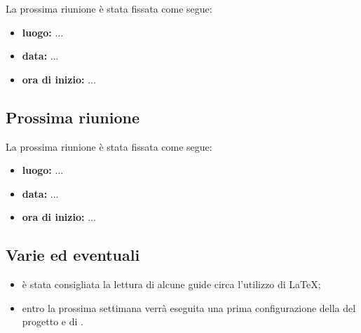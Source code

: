 		
		
		
La prossima riunione è stata fissata come segue:
\begin{itemize}
	\item \textbf{luogo:} ...
	\item \textbf{data:} ...
	\item \textbf{ora di inizio:} ...
\end{itemize}


\subsection{Prossima riunione}
La prossima riunione è stata fissata come segue:
\begin{itemize}
	\item \textbf{luogo:} ...
	\item \textbf{data:} ...
	\item \textbf{ora di inizio:} ...
\end{itemize}


\subsection{Varie ed eventuali}
\begin{itemize}

	\item è stata consigliata la lettura di alcune guide circa l'utilizzo di \LaTeX{};
	\item entro la prossima settimana verrà eseguita una prima configurazione della  del progetto e di .
\end{itemize}


